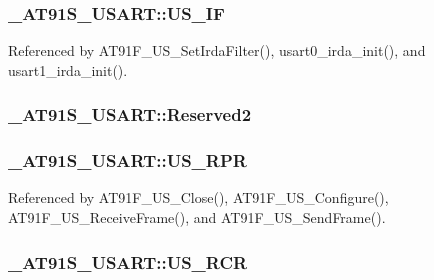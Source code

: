 \hypertarget{struct__AT91S__USART_db169c39500af9792d94e66c63d185ca}{
\subsubsection{ {\bf \_\-AT91S\_\-USART::US\_\-IF}}}
\label{struct__AT91S__USART_db169c39500af9792d94e66c63d185ca}




Referenced by AT91F\_\-US\_\-SetIrdaFilter(), usart0\_\-irda\_\-init(), and usart1\_\-irda\_\-init().\hypertarget{struct__AT91S__USART_0e7ae6d46277c7e5475cdf4b01760a7d}{
\subsubsection{ {\bf \_\-AT91S\_\-USART::Reserved2}}}
\label{struct__AT91S__USART_0e7ae6d46277c7e5475cdf4b01760a7d}


\hypertarget{struct__AT91S__USART_dc2655f55dd059852f17b597e49bbdaa}{
\subsubsection{ {\bf \_\-AT91S\_\-USART::US\_\-RPR}}}
\label{struct__AT91S__USART_dc2655f55dd059852f17b597e49bbdaa}




Referenced by AT91F\_\-US\_\-Close(), AT91F\_\-US\_\-Configure(), AT91F\_\-US\_\-ReceiveFrame(), and AT91F\_\-US\_\-SendFrame().\hypertarget{struct__AT91S__USART_d7d236e9821cefe1ae1f4a8e1487fd58}{
\subsubsection{ {\bf \_\-AT91S\_\-USART::US\_\-RCR}}}
\label{struct__AT91S__USART_d7d236e9821cefe1ae1f4a8e1487fd58}


